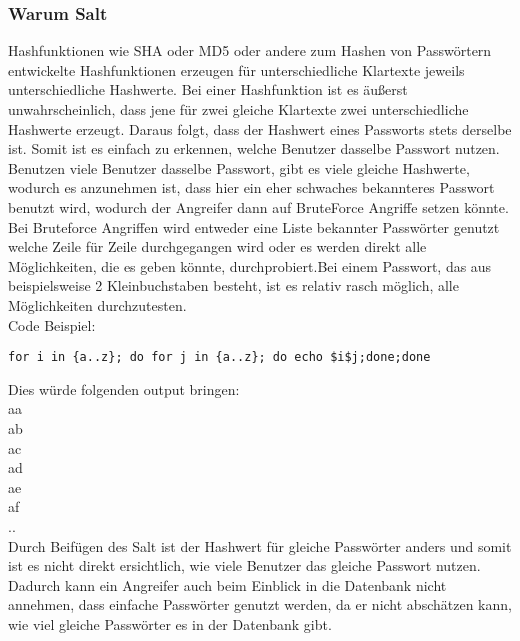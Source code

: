 {\subsubsection{Warum Salt}
Hashfunktionen wie SHA oder MD5 oder andere zum Hashen von Passwörtern entwickelte Hashfunktionen erzeugen für unterschiedliche Klartexte jeweils unterschiedliche Hashwerte. Bei einer Hashfunktion ist es äußerst unwahrscheinlich, dass jene für zwei gleiche Klartexte zwei unterschiedliche Hashwerte erzeugt. Daraus folgt, dass der Hashwert eines Passworts stets derselbe ist. Somit ist es einfach zu erkennen, welche Benutzer dasselbe Passwort nutzen. Benutzen viele Benutzer dasselbe Passwort, gibt es viele gleiche Hashwerte, wodurch es anzunehmen ist, dass hier ein eher schwaches bekannteres Passwort benutzt wird, wodurch der Angreifer dann auf BruteForce Angriffe setzen könnte. Bei Bruteforce Angriffen wird entweder eine Liste bekannter Passwörter genutzt welche Zeile für Zeile durchgegangen wird oder es werden direkt alle Möglichkeiten, die es geben könnte, durchprobiert.Bei einem Passwort, das aus beispielsweise 2 Kleinbuchstaben besteht, ist es relativ rasch möglich, alle Möglichkeiten durchzutesten.\\ Code Beispiel:
\begin{lstlisting}[caption={Bruteforce example }]
for i in {a..z}; do for j in {a..z}; do echo $i$j;done;done 
\end{lstlisting}
Dies würde folgenden output bringen: \\
aa\\
ab\\
ac\\
ad\\
ae\\
af\\
..\\
Durch Beifügen des Salt ist der Hashwert für gleiche Passwörter anders und somit ist es nicht direkt ersichtlich, wie viele Benutzer das gleiche Passwort nutzen. Dadurch kann ein Angreifer auch beim Einblick in die Datenbank nicht annehmen, dass einfache Passwörter genutzt werden, da er nicht abschätzen kann, wie viel gleiche Passwörter es in der Datenbank gibt.
}
